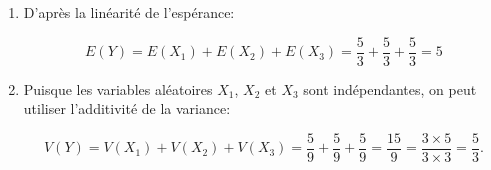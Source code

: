\documentclass[10pt]{article}
\begin{document}
\begin{enumerate}
\begin{enumerate}
		\item D'après la linéarité de l'espérance:
		
		\[E(Y) = E\left(X_{1}\right) + E\left(X_{2}\right) + E\left(X_{3}\right) = \dfrac{5}{3} + \dfrac{5}{3} + \dfrac{5}{3} = \boxed{5}\]
		
		\item Puisque les variables aléatoires $X_{1}$, $X_{2}$ et $X_{3}$ sont indépendantes, on peut utiliser l'additivité de la variance:
		
		\[V(Y) = V\left(X_{1}\right) + V\left(X_{2}\right) + V\left(X_{3}\right) = \dfrac{5}{9} + \dfrac{5}{9} + \dfrac{5}{9} = \dfrac{15}{9} = \dfrac{3 \times 5}{3 \times 3} = \boxed{\dfrac{5}{3}}.\]
	\end{enumerate}
\end{enumerate}


\bigskip
\end{document}
